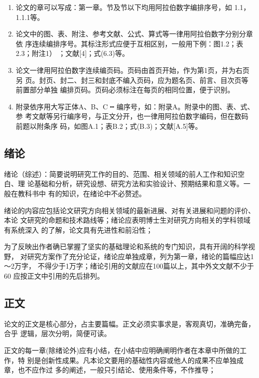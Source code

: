 \documentclass[oneside, phd]{njuthesis}
\begin{document}
\begin{enumerate}

\item 论文的章可以写成：第一章。节及节以下均用阿拉伯数字编排序号，如
1.1，1.1.1等。

\item 论文中的图、表、附注、参考文献、公式、算式等一律用阿拉伯数字分别分章依
序连续编排序号。其标注形式应便于互相区别，一般用下例：图1.2；表2.3；附注1）
；文献[4]；式(6.3)等。

\item 论文一律用阿拉伯数字连续编页码。页码由首页开始，作为第1页，并为右页另
页。封页、封二、封三和封底不编入页码，应为题名页、前言、目次页等前置部分单独
编排页码。页码必须标注在每页的相同位置，便于识别。

\item 附录依序用大写正体A、B、C ┅ 编序号，如：附录A。附录中的图、表、式、参
考文献等另行编序号，与正文分开，也一律用阿拉伯数字编码，但在数码前题以附条序
码，如图A.1；表B.2；式(B.3)；文献[A.5]等。

\end{enumerate}

\subsection{绪论}

绪论（综述）：简要说明研究工作的目的、范围、相关领域的前人工作和知识空白、理
论基础和分析，研究设想、研究方法和实验设计、预期结果和意义等。一般在教科书中
有的知识，在绪论中不必赘述。

绪论的内容应包括论文研究方向相关领域的最新进展、对有关进展和问题的评价、本论
文研究的命题和技术路线等；绪论应表明博士生对研究方向相关的学科领域有系统深入
的了解，论文具有先进性和前沿性；

为了反映出作者确已掌握了坚实的基础理论和系统的专门知识，具有开阔的科学视野，
对研究方案作了充分论证，绪论应单独成章，列为第一章，绪论的篇幅应达1～2万字，
不得少于1万字；绪论引用的文献应在100篇以上，其中外文文献不少于60%
应按正文中引用的先后排列。

\subsection{正文}

论文的正文是核心部分，占主要篇幅。正文必须实事求是，客观真切，准确完备，合乎
逻辑，层次分明，简便可读。

正文的每一章(除绪论外)应有小结，在小结中应明确阐明作者在本章中所做的工作，特
别是创新性成果。凡本论文要用的基础性内容或他人的成果不应单独成章，也不应作过
多的阐述，一般只引结论、使用条件等，不作推导；
\end{document}
